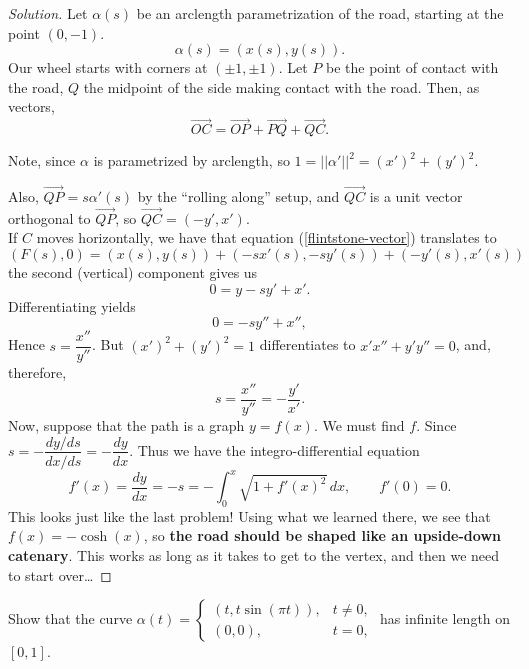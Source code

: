 \documentclass[Shifrin_Solutions_Spring_2015]{subfiles}
\begin{document}
\begin{proof}[Solution]
Let $\alpha(s)$ be an arclength parametrization of the road, starting at the point $(0,-1)$.
\[
\alpha(s) = ( x(s), y(s) ).
\]
Our wheel starts with corners at $(\pm 1, \pm 1)$. Let $P$ be the point of contact with the road, $Q$ the midpoint of the side making contact with the road. Then, as vectors,
\begin{equation}\label{flintstone-vector}
\overrightarrow{OC} = \overrightarrow{OP} + \overrightarrow{PQ} + \overrightarrow{QC}.
\end{equation}

Note, since $\alpha$ is parametrized by arclength, so $1=||\alpha'||^2=(x')^2+(y')^2$.

Also, $\overrightarrow{QP} = s\alpha'(s)$ by the ``rolling along'' setup, and $\overrightarrow{QC}$ is a unit vector orthogonal to $\overrightarrow{QP}$, so $\overrightarrow{QC} = (-y', x')$.\\

If $C$ moves horizontally, we have that equation (\ref{flintstone-vector}) translates to
\[
(F(s), 0 ) = (x(s), y(s) ) + (-s x'(s) , -sy'(s) ) + (-y'(s), x'(s) )
\]
the second (vertical) component gives us
\[
0 = y -s y' + x' .
\]
Differentiating yields
\[
0 = -s y'' + x'' ,
\]
Hence $s = \dfrac{x''}{y''}$.  But $(x')^2 + (y')^2 = 1$ differentiates to $x'x'' + y' y'' = 0$, and, therefore,
\[
s = \dfrac{x''}{y''} = - \dfrac{y'}{x'} .
\]
Now, suppose that the path is a graph $y=f(x)$. We must find $f$. Since $s = - \dfrac{dy/ds}{dx/ds} = -\dfrac{dy}{dx}$. Thus we have the integro-differential equation
\[
f'(x) = \dfrac{dy}{dx} = -s = - \int_0^x \sqrt{1 + f'(x)^2 }\, dx, \qquad f'(0) = 0.
\]
This looks just like the last problem! Using what we learned there, we see that $f(x) = -\cosh(x)$, so \textbf{the road should be shaped like an upside-down catenary}. This works as long as it takes to get to the vertex, and then we need to start over\dots
\end{proof}




\begin{exercise}
Show that the curve $\alpha(t) = \left\{ \begin{matrix}\left(t, t \sin(\pi t)\right), & t \neq 0, \\ (0,0), & t = 0, \end{matrix} \right. $ has infinite length on $[0,1]$.
\end{exercise}
\end{document}
